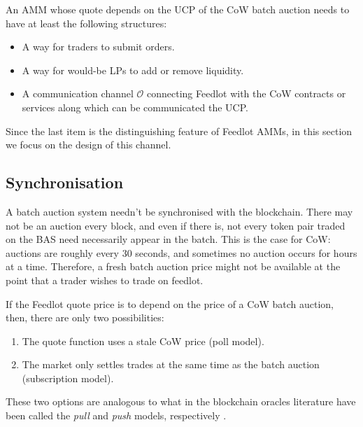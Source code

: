 \documentclass[a4paper,10pt]{article}
\begin{document}
An AMM whose quote depends on the UCP of the CoW batch auction needs to have at least the following structures:
\begin{itemize}
  \item A way for traders to submit orders.
  \item A way for would-be LPs to add or remove liquidity.
  \item A communication channel $\mathcal{O}$ connecting Feedlot with the CoW contracts or services along which can be communicated the UCP.
\end{itemize}
Since the last item is the distinguishing feature of Feedlot AMMs, in this section we focus on the design of this channel.

\subsection{Synchronisation}

A batch auction system needn't be synchronised with the blockchain.
%
There may not be an auction every block, and even if there is, not every token pair traded on the BAS need necessarily appear in the batch.
%
This is the case for CoW: auctions are roughly every 30 seconds, and sometimes no auction occurs for hours at a time.
%
Therefore, a fresh batch auction price might not be available at the point that a trader wishes to trade on feedlot.

If the Feedlot quote price is to depend on the price of a CoW batch auction, then, there are only two possibilities:
\begin{enumerate}
  \item The quote function uses a stale CoW price (poll model).
  \item The market only settles trades at the same time as the batch auction (subscription model).
\end{enumerate}
These two options are analogous to what in the blockchain oracles literature have been called the \emph{pull} and \emph{push} models, respectively \cite{heiss2019oracles,muhlberger2020foundational}.
\end{document}
